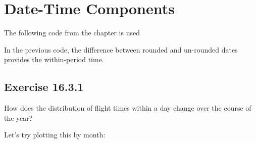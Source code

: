 \documentclass[]{book}
\newenvironment{Shaded}{\begin{snugshade}}{\end{snugshade}}
\newcommand{\DataTypeTok}[1]{\textcolor[rgb]{0.13,0.29,0.53}{#1}}
\newcommand{\DecValTok}[1]{\textcolor[rgb]{0.00,0.00,0.81}{#1}}
\newcommand{\KeywordTok}[1]{\textcolor[rgb]{0.13,0.29,0.53}{\textbf{#1}}}
\newcommand{\NormalTok}[1]{#1}
\newcommand{\OperatorTok}[1]{\textcolor[rgb]{0.81,0.36,0.00}{\textbf{#1}}}
\newcommand{\OtherTok}[1]{\textcolor[rgb]{0.56,0.35,0.01}{#1}}
\newcommand{\StringTok}[1]{\textcolor[rgb]{0.31,0.60,0.02}{#1}}
\theoremstyle{plain}
\theoremstyle{remark}
\begin{document}
\hypertarget{date-time-components}{%
\section{Date-Time Components}\label{date-time-components}}

The following code from the chapter is used

\begin{Shaded}
\end{Shaded}

In the previous code, the difference between rounded and un-rounded
dates provides the within-period time.

\hypertarget{exercise-16.3.1}{%
\subsection*{\texorpdfstring{Exercise
{16.3.1}}{Exercise 16.3.1}}\label{exercise-16.3.1}}

How does the distribution of flight times within a day change over the
course of the year?

Let's try plotting this by month:

\begin{Shaded}
\end{Shaded}
\end{document}
